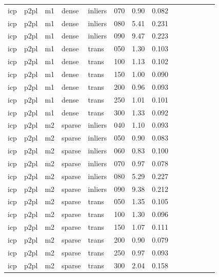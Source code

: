 \begin{table}[htbp]
\begin{tabular}{llllllrrrrrrrr}
  icp & p2pl & m1 & dense & inliers & 070 & 0.90 & 0.082 \\
  icp & p2pl & m1 & dense & inliers & 080 & 5.41 & 0.231 \\
  icp & p2pl & m1 & dense & inliers & 090 & 9.47 & 0.223 \\
  icp & p2pl & m1 & dense & trans & 050 & 1.30 & 0.103 \\
  icp & p2pl & m1 & dense & trans & 100 & 1.13 & 0.102 \\
  icp & p2pl & m1 & dense & trans & 150 & 1.00 & 0.090 \\
  icp & p2pl & m1 & dense & trans & 200 & 0.96 & 0.093 \\
  icp & p2pl & m1 & dense & trans & 250 & 1.01 & 0.101 \\
  icp & p2pl & m1 & dense & trans & 300 & 1.33 & 0.092 \\
  icp & p2pl & m2 & sparse & inliers & 040 & 1.10 & 0.093 \\
  icp & p2pl & m2 & sparse & inliers & 050 & 0.90 & 0.083 \\
  icp & p2pl & m2 & sparse & inliers & 060 & 0.83 & 0.100 \\
  icp & p2pl & m2 & sparse & inliers & 070 & 0.97 & 0.078 \\
  icp & p2pl & m2 & sparse & inliers & 080 & 5.29 & 0.227 \\
  icp & p2pl & m2 & sparse & inliers & 090 & 9.38 & 0.212 \\
  icp & p2pl & m2 & sparse & trans & 050 & 1.35 & 0.105 \\
  icp & p2pl & m2 & sparse & trans & 100 & 1.30 & 0.096 \\
  icp & p2pl & m2 & sparse & trans & 150 & 1.07 & 0.111 \\
  icp & p2pl & m2 & sparse & trans & 200 & 0.90 & 0.079 \\
  icp & p2pl & m2 & sparse & trans & 250 & 0.97 & 0.093 \\
  icp & p2pl & m2 & sparse & trans & 300 & 2.04 & 0.158 \\
\bottomrule
\end{tabular}
\end{table}
